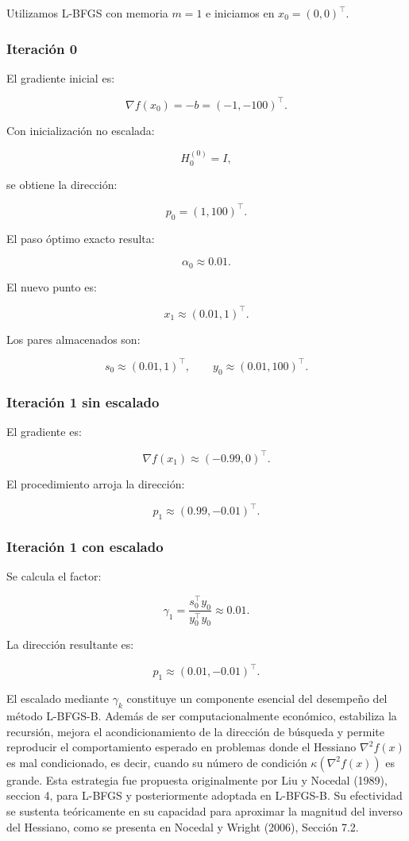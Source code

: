 \documentclass[
  spanish,
  us-letterpaper,
]{scrreprt}
\numberwithin{equation}{section}
\begin{document}
Utilizamos L-BFGS con memoria \(m=1\) e iniciamos en
\(x_0 = (0,0)^\top\).

\subsubsection{Iteración 0}\label{iteraciuxf3n-0}

El gradiente inicial es:

\[
\nabla f(x_0) = -b = (-1,-100)^\top.
\]

Con inicialización no escalada:

\[
H_0^{(0)} = I,
\]

se obtiene la dirección:

\[
p_0 = (1,100)^\top.
\]

El paso óptimo exacto resulta:

\[
\alpha_0 \approx 0.01.
\]

El nuevo punto es:

\[
x_1 \approx (0.01, 1)^\top.
\]

Los pares almacenados son:

\[
s_0 \approx (0.01, 1)^\top,
\qquad
y_0 \approx (0.01, 100)^\top.
\]

\subsubsection{Iteración 1 sin
escalado}\label{iteraciuxf3n-1-sin-escalado}

El gradiente es:

\[
\nabla f(x_1) \approx (-0.99, 0)^\top.
\]

El procedimiento arroja la dirección:

\[
p_1 \approx (0.99, -0.01)^\top.
\]

\subsubsection{Iteración 1 con
escalado}\label{iteraciuxf3n-1-con-escalado}

Se calcula el factor:

\[
\gamma_1 =
\frac{s_0^\top y_0}{y_0^\top y_0}
\approx 0.01.
\]

La dirección resultante es:

\[
p_1 \approx (0.01, -0.01)^\top.
\]

El escalado mediante \(\gamma_k\) constituye un componente esencial del
desempeño del método L-BFGS-B. Además de ser computacionalmente
económico, estabiliza la recursión, mejora el acondicionamiento de la
dirección de búsqueda y permite reproducir el comportamiento esperado en
problemas donde el Hessiano \(\nabla^2 f(x)\) es mal condicionado, es
decir, cuando su número de condición \(\kappa(\nabla^2 f(x))\) es
grande. Esta estrategia fue propuesta originalmente por Liu y Nocedal
(1989), seccion 4, para L-BFGS y posteriormente adoptada en L-BFGS-B. Su
efectividad se sustenta teóricamente en su capacidad para aproximar la
magnitud del inverso del Hessiano, como se presenta en Nocedal y Wright
(2006), Sección 7.2.
\end{document}
